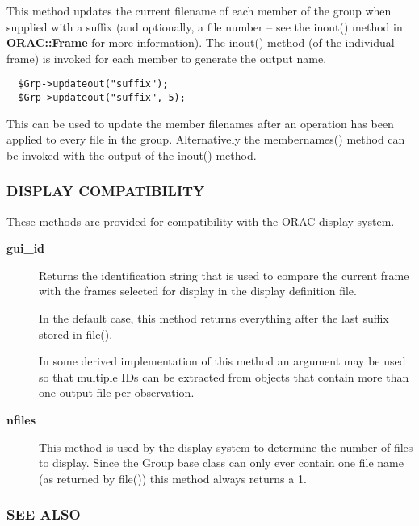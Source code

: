 \begin{description}
This method updates the current filename of each member of the group
when supplied with a suffix (and optionally, a file number -- see the
inout() method in \textbf{ORAC::Frame} for more information). The inout() 
method (of the individual frame) is invoked for each member to 
generate the output name.

\begin{verbatim}
  $Grp->updateout("suffix");
  $Grp->updateout("suffix", 5);
\end{verbatim}


This can be used to update the member filenames after an operation
has been applied to every file in the group. Alternatively the 
membernames() method can be invoked with the output of the inout()
method.

\end{description}
\subsubsection*{DISPLAY COMPATIBILITY\label{ORAC::Group_DISPLAY_COMPATIBILITY}}


These methods are provided for compatibility with the ORAC display
system.

\begin{description}

\item[\textbf{gui\_id}] \mbox{}

Returns the identification string that is used to compare the
current frame with the frames selected for display in the
display definition file.



In the default case, this method returns everything after the
last suffix stored in file().



In some derived implementation of this method an argument
may be used so that multiple IDs can be extracted from objects
that contain more than one output file per observation.


\item[\textbf{nfiles}] \mbox{}

This method is used by the display system to determine the
number of files to display. Since the Group base class can only
ever contain one file name (as returned by file()) this method
always returns a 1.

\end{description}
\subsubsection*{SEE ALSO\label{ORAC::Group_SEE_ALSO}}


